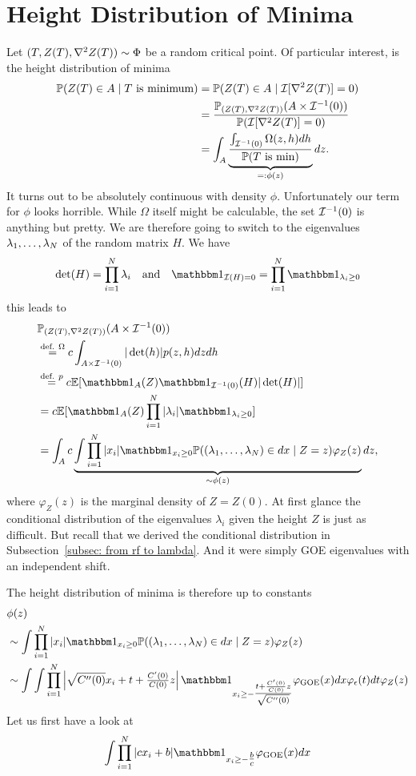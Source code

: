 \section{Height Distribution of Minima}

Let \((T,Z(T),\nabla^2Z(T))\sim\Phi\) be a random critical point.
Of particular interest, is the height distribution of minima
\[\begin{aligned}
	\mathbb{P}(Z(T)\in A \mid T\text{ is minimum})
	&=\mathbb{P}(Z(T)\in A \mid \mathcal{I}[\nabla^2Z(T)]=0)\\
	&= \frac{\mathbb{P}_{(Z(T), \nabla^2Z(T))}(A\times \mathcal{I}^{-1}(0))}{\mathbb{P}(\mathcal{I}[\nabla^2Z(T)]=0)}\\
	&= \int_A \underbrace{
		\frac{\int_{\mathcal{I}^{-1}(0)} \Omega(z,h) dh}{\mathbb{P}(T\text{ is min})}
	}_{=: \phi(z)} dz.
\end{aligned}\]
It turns out to be absolutely continuous with density \(\phi\). Unfortunately
our term for \(\phi\) looks horrible. While \(\Omega\) itself might be
calculable, the set \(\mathcal{I}^{-1}(0)\) is anything but pretty. We are therefore
going to switch to the eigenvalues \(\lambda_1,\dots,\lambda_N\) of
the random matrix \(H\). We have
\[
	\det(H) = \prod_{i=1}^\dimension \lambda_i
	\quad\text{and}\quad
	\ind_{\negEV(H) = 0} = \prod_{i=1}^\dimension \ind_{\lambda_i\ge 0}
\]
this leads to 
\[\begin{aligned}
	&\Pr_{(\rf(T), \nabla^2\rf(T))}(A\times \negEV^{-1}(0))\\
	&\overset{\text{def. }\Omega}= c\int_{A\times\negEV^{-1}(0)} |\det(h)| p(z,h)dz dh\\
	&\overset{\text{def. } p}= c\E[\ind_{A}(Z)\ind_{\negEV^{-1}(0)}(H)|\det(H)|]\\
	&= c\E[\ind_{A}(Z)\prod_{i=1}^\dimension |\lambda_i| \ind_{\lambda_i \ge 0}]\\
	&= \int_A c\underbrace{
		\int \prod_{i=1}^\dimension |x_i| \ind_{x_i\ge 0}
		\Pr((\lambda_1,\dots,\lambda_\dimension)\in dx\mid Z=z) \varphi_Z(z)
	}_{\sim\phi(z)}
	dz,
\end{aligned}\]
where \(\varphi_Z(z)\) is the marginal density of \(Z=Z(0)\). At first glance
the conditional distribution of the eigenvalues \(\lambda_i\) given the
height \(Z\) is just as difficult. But recall that we derived the conditional
distribution in Subsection~\ref{subsec: from rf to lambda}. And
it were simply GOE eigenvalues with an independent shift.

The height distribution
of minima is therefore up to constants
\[\begin{aligned}
	&\phi(z)\\
	&\sim\int \prod_{i=1}^\dimension |x_i| \ind_{x_i\ge 0}
	\Pr((\lambda_1,\dots,\lambda_\dimension)\in dx\mid Z=z) \varphi_Z(z)\\
	&\sim\int \int \prod_{i=1}^\dimension
	\left|\sqrt{\sqC''(0)}x_i + t + \tfrac{\sqC'(0)}{\sqC(0)}z\right|
	\ind_{x_i\ge - \tfrac{t+\frac{\sqC'(0)}{\sqC(0)}z}{\sqrt{\sqC''(0)}}}
	\varphi_{\text{GOE}}(x) dx \varphi_\epsilon(t)dt \varphi_Z(z)\\
\end{aligned}\]
Let us first have a look at
\[
	\int\prod_{i=1}^\dimension |c x_i + b| \ind_{x_i \ge -\tfrac{b}{c}}\varphi_{\text{GOE}}(x)dx
\]